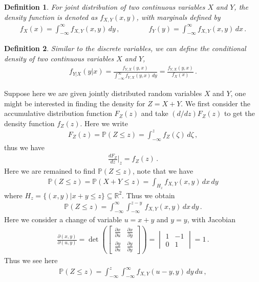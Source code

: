 \documentclass[11pt, onesided]{book}
\theoremstyle{break}
\theoremstyle{break}
\newtheorem{defn}{Definition}[thm]
\newcommand{\R}{\mathbb{R}}
\newcommand{\pd}{\partial}
\newcommand{\vmat}[1]{\begin{vmatrix} #1 \end{vmatrix}}
\newcommand{\bmat}[1]{\begin{bmatrix} #1 \end{bmatrix}}
\begin{document}
\begin{defn}
For joint distribution of two continuous variables $X$ and $Y$, the density function is denoted as $f_{X,Y}(x,y)$, with marginals defined by
\begin{align*}
f_X(x) = \int_{-\infty}^{\infty}f_{X,Y}(x,y) \, dy \,,\qquad\qquad
f_{Y}(y) = \int_{-\infty}^\infty f_{X,Y}(x,y)\, dx \,.
\end{align*}
\end{defn}
\begin{defn}
Similar to the discrete variables, we can define the conditional density of two continuous variables $X$ and $Y$,
\begin{align*}
f_{Y|X}(y|x) =\frac{f_{Y,X}(y,x)}{\int_{-\infty}^\infty f_{Y,X}(y,x)\, dy} =\frac{f_{Y,X}(y,x)}{f_X(x)}\,.
\end{align*}
\end{defn}
Suppose here we are given jointly distributed random variables $X$ and $Y$, one might be interested in finding the density for $Z=X+Y$. We first consider the accumulative distribution function $F_Z(z)$ and take $(d/dz)F_Z(z)$ to get the density function $f_Z(z)$. Here we write
\begin{align*}
F_Z(z) = \mathbb{P}(Z\leq z) = \int_{-\infty}^z f_Z(\zeta) \, d\zeta\,,
\end{align*}
thus we have
\begin{align*}
\frac{dF_Z}{dz}|_{z} = f_Z(z)\,.
\end{align*}
Here we are remained to find $\mathbb{P}(Z\leq z)$, note that we have
\begin{align*}
\mathbb{P}(Z\leq z) = \mathbb{P}(X+Y\leq z) = \int_{H_z}f_{X,Y}(x,y) \,dx\,dy
\end{align*}
where $H_z = \{(x,y)|x+y\leq z\} \subseteq \R^2$. Thus we obtain
\begin{align*}
\mathbb{P}(Z\leq z) = \int_{-\infty}^\infty \int_{-\infty}^{z-y}\, f_{X,Y}(x,y)\, dx\, dy\,.
\end{align*}
Here we consider a change of variable $u = x+y$ and $y = y$, with Jacobian
\begin{align*}
\frac{\pd (x,y)}{\pd (u,y)} = \det\left(\bmat{\frac{\pd x}{\pd u}& \frac{\pd x}{\pd y}\\
\frac{\pd y }{\pd u} & \frac{\pd y}{\pd y}  } \right) = \vmat{1 & -1 \\ 0 & 1} = 1\,.
\end{align*}
Thus we see here
\begin{align*}
\mathbb{P}(Z\leq z) = \int_{-\infty}^z\int_{-\infty}^\infty f_{X,Y}(u-y,y)\, dy\, du\,,
\end{align*}
\end{document}
